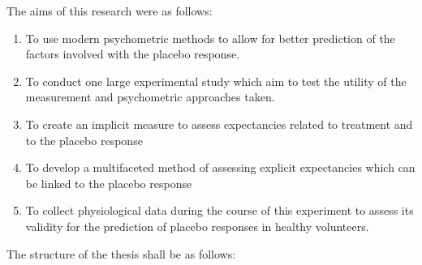 The aims of this research were as follows:
\begin{enumerate}
\item To use modern psychometric methods to allow for better prediction of the factors involved with the placebo response. 

\item To conduct one large experimental study which aim to test the utility of the measurement and psychometric approaches taken. 

\item To create an implicit measure to assess expectancies related to treatment and to the placebo response

\item To develop a multifaceted method of assessing explicit expectancies which can be linked to the placebo response

\item To collect physiological data during the course of this experiment to assess its validity for the prediction of placebo responses in healthy volunteers.
\end{enumerate}

The structure of the thesis shall be as follows:

